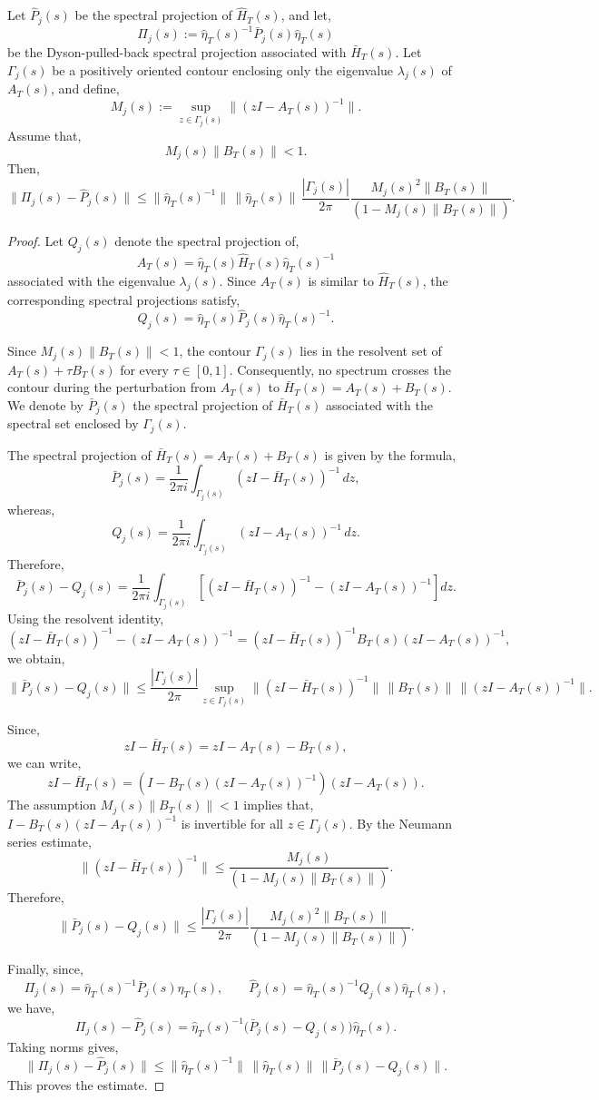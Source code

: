 \documentclass[10pt,a4paper]{amsart}
\begin{document}
\begin{proposition}
\label{prop:ProjectionComparison}
Let \(\hat P_j(s)\) be the spectral projection of \(\hat H_T(s)\), and let,
\[
\Pi_j(s):=\hat\eta_T(s)^{-1}\bar P_j(s)\hat\eta_T(s)
\]
be the Dyson-pulled-back spectral projection associated with \(\bar H_T(s)\).
Let \(\Gamma_j(s)\) be a positively oriented contour enclosing only the eigenvalue
\(\lambda_j(s)\) of \(A_T(s)\), and define,
\[
M_j(s):=\sup_{z\in\Gamma_j(s)}\|(zI-A_T(s))^{-1}\|.
\]
Assume that,
\[
M_j(s)\|B_T(s)\|<1.
\]
Then,
\[
\|\Pi_j(s)-\hat P_j(s)\|
\le
\|\hat\eta_T(s)^{-1}\|\,\|\hat\eta_T(s)\|\,
\frac{|\Gamma_j(s)|}{2\pi}
\frac{M_j(s)^2\|B_T(s)\|}
{(1-M_j(s)\|B_T(s)\|)}.
\]
\end{proposition}

\begin{proof}
Let \(Q_j(s)\) denote the spectral projection of,
\[
A_T(s)=\hat\eta_T(s)\hat H_T(s)\hat\eta_T(s)^{-1}
\]
associated with the eigenvalue \(\lambda_j(s)\). Since \(A_T(s)\) is similar to
\(\hat H_T(s)\), the corresponding spectral projections satisfy,
\[
Q_j(s)=\hat\eta_T(s)\hat P_j(s)\hat\eta_T(s)^{-1}.
\]

Since \(M_j(s)\|B_T(s)\|<1\), the contour \(\Gamma_j(s)\) lies in the
resolvent set of \(A_T(s)+\tau B_T(s)\) for every \(\tau\in[0,1]\).
Consequently, no spectrum crosses the contour during the perturbation from
\(A_T(s)\) to \(\bar H_T(s)=A_T(s)+B_T(s)\). We denote by \(\bar P_j(s)\) the
spectral projection of \(\bar H_T(s)\) associated with the spectral set enclosed by
\(\Gamma_j(s)\).

The spectral projection of \(\bar H_T(s)=A_T(s)+B_T(s)\) is given by the formula,
\[
\bar P_j(s)=\frac{1}{2\pi i}\int_{\Gamma_j(s)}
(zI-\bar H_T(s))^{-1}\,dz,
\]
whereas,
\[
Q_j(s)=\frac{1}{2\pi i}\int_{\Gamma_j(s)}
(zI-A_T(s))^{-1}\,dz.
\]
Therefore,
\[
\bar P_j(s)-Q_j(s)
=
\frac{1}{2\pi i}\int_{\Gamma_j(s)}
\left[(zI-\bar H_T(s))^{-1}-(zI-A_T(s))^{-1}\right]dz.
\]
Using the resolvent identity,
\[
(zI-\bar H_T(s))^{-1}-(zI-A_T(s))^{-1}
=
(zI-\bar H_T(s))^{-1}B_T(s)(zI-A_T(s))^{-1},
\]
we obtain,
\[
\|\bar P_j(s)-Q_j(s)\|
\le
\frac{|\Gamma_j(s)|}{2\pi}
\sup_{z\in\Gamma_j(s)}
\|(zI-\bar H_T(s))^{-1}\|\,\|B_T(s)\|\,
\|(zI-A_T(s))^{-1}\|.
\]

Since,
\[
zI-\bar H_T(s)
=
zI-A_T(s)-B_T(s),
\]
we can write,
\[
zI-\bar H_T(s)
=
\left(I-B_T(s)(zI-A_T(s))^{-1}\right)(zI-A_T(s)).
\]
The assumption \(M_j(s)\|B_T(s)\|<1\) implies that,
\(
I-B_T(s)(zI-A_T(s))^{-1}
\)
is invertible for all \(z\in\Gamma_j(s)\). By the Neumann series estimate,
\[
\|(zI-\bar H_T(s))^{-1}\|
\le
\frac{M_j(s)}{(1-M_j(s)\|B_T(s)\|)}.
\]
Therefore,
\[
\|\bar P_j(s)-Q_j(s)\|
\le
\frac{|\Gamma_j(s)|}{2\pi}
\frac{M_j(s)^2\|B_T(s)\|}{(1-M_j(s)\|B_T(s)\|)}.
\]

Finally, since,
\[
\Pi_j(s)=\hat\eta_T(s)^{-1}\bar P_j(s)\hat\eta_T(s),
\qquad
\hat P_j(s)=\hat\eta_T(s)^{-1}Q_j(s)\hat\eta_T(s),
\]
we have,
\[
\Pi_j(s)-\hat P_j(s)
=
\hat\eta_T(s)^{-1}\big(\bar P_j(s)-Q_j(s)\big)\hat\eta_T(s).
\]
Taking norms gives,
\[
\|\Pi_j(s)-\hat P_j(s)\|
\le
\|\hat\eta_T(s)^{-1}\|\,\|\hat\eta_T(s)\|\,
\|\bar P_j(s)-Q_j(s)\|.
\]
This proves the estimate.
\end{proof}
\end{document}
